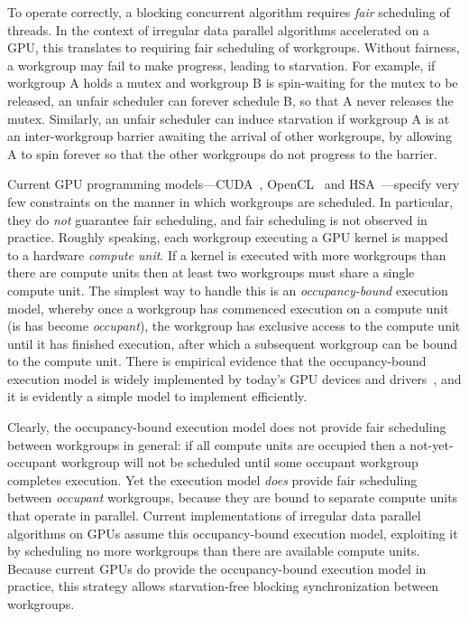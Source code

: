 \documentclass[nocopyrightspace]{sigplanconf-pldi16}
\begin{document}
To operate correctly, a blocking concurrent algorithm requires
\emph{fair} scheduling of threads.  In the context of irregular data
parallel algorithms accelerated on a GPU, this translates to requiring
fair scheduling of workgroups.  Without fairness, a workgroup may fail
to make progress, leading to starvation.  For example, if workgroup A
holds a mutex and workgroup B is spin-waiting for the mutex to be
released, an unfair scheduler can forever schedule B, so that A never
releases the mutex.  Similarly, an unfair scheduler can induce
starvation if workgroup A is at an inter-workgroup barrier awaiting
the arrival of other workgroups, by allowing A to spin forever so that
the other workgroups do not progress to the barrier.

Current GPU programming models---CUDA~\cite{...}, OpenCL~\cite{...}
and HSA~\cite{...}---specify very few constraints on the manner in
which workgroups are scheduled.  In particular, they do \emph{not}
guarantee fair scheduling, and fair scheduling is not observed in
practice.  Roughly speaking, each workgroup executing a GPU kernel is
mapped to a hardware \emph{compute unit}.  If a kernel is executed
with more workgroups than there are compute units then at least two
workgroups must share a single compute unit.  The simplest way to
handle this is an \emph{occupancy-bound} execution model, whereby once
a workgroup has commenced execution on a compute unit (is has become
\emph{occupant}), the workgroup has exclusive access to the compute
unit until it has finished execution, after which a subsequent
workgroup can be bound to the compute unit.  There is empirical
evidence that the occupancy-bound execution model is widely
implemented by today's GPU devices and drivers~\cite{...}, and it is
evidently a simple model to implement efficiently.

Clearly, the occupancy-bound execution model does not provide fair
scheduling between workgroups in general: if all compute units are
occupied then a not-yet-occupant workgroup will not be scheduled until
some occupant workgroup completes execution.  Yet the execution
model \emph{does} provide fair scheduling between \emph{occupant} workgroups,
because they are bound to separate compute units that operate in parallel.
Current implementations of irregular data parallel algorithms on GPUs
assume this occupancy-bound execution model, exploiting it by
scheduling no more workgroups than there are available compute units.
Because current GPUs do provide the occupancy-bound execution model in
practice, this strategy allows starvation-free blocking
synchronization between workgroups.
\end{document}

